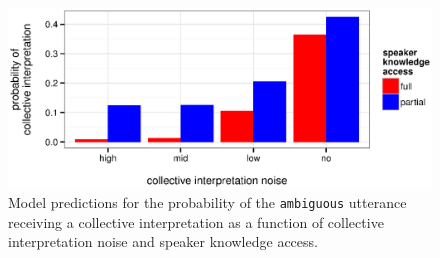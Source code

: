 \documentclass[linguex]{sp}
\begin{document}
\begin{figure}[h]
	\centering
	\includegraphics[width=\linewidth]{plots/model-results.eps}
	\vspace{-20pt}
	\caption{Model predictions for the probability of the \texttt{ambiguous} utterance receiving a collective interpretation as a function of collective interpretation noise and speaker knowledge access.} \label{modelresults}
\end{figure}


\end{document}
